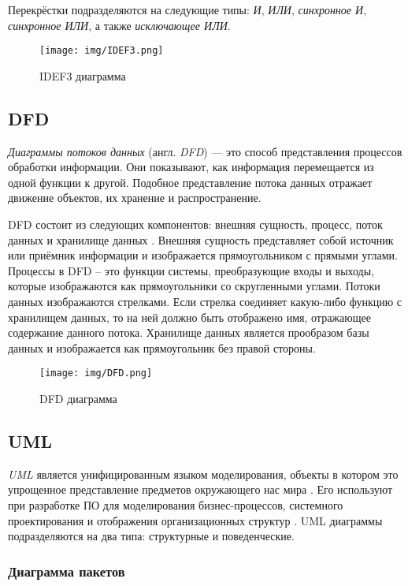 \documentclass[14pt,russian]{extarticle}
\newcommand*\obj[1]{\textit{#1}}
\newcommand*\term[1]{\textit{#1}}
\begin{document}
Перекрёстки подразделяются на следующие типы: \obj{И}, \obj{ИЛИ},
\obj{синхронное И}, \obj{синхронное ИЛИ}, а также \obj{исключающее ИЛИ}.

\begin{sidewaysfigure}
	\centering
	\texttt{[image: img/IDEF3.png]}
	\caption{IDEF3 диаграмма}
\end{sidewaysfigure}

\subsection{DFD}

\term{Диаграммы потоков данных} (англ. \term{DFD}) –-- это способ представления
процессов обработки информации. Они показывают, как информация перемещается из
одной функции к другой. Подобное представление потока данных отражает движение
объектов, их хранение и распространение.

DFD состоит из следующих компонентов: внешняя сущность, процесс, поток данных и
хранилище данных \cite{dfd}. Внешняя сущность представляет собой источник или приёмник
информации и изображается прямоугольником с прямыми углами. Процессы в DFD – это
функции системы, преобразующие входы и выходы, которые изображаются как
прямоугольники со скругленными углами. Потоки данных изображаются стрелками.
Если стрелка соединяет какую-либо функцию с хранилищем данных, то на ней должно
быть отображено имя, отражающее содержание данного потока. Хранилище данных
является прообразом базы данных и изображается как прямоугольник без правой
стороны.

\begin{figure}[H]
	\centering
	\texttt{[image: img/DFD.png]}
	\caption{DFD диаграмма}
\end{figure}

\subsection{UML}

\term{UML} является унифицированным языком моделирования, объекты в котором это
упрощенное представление предметов окружающего нас мира \cite{hunt}. Его используют при
разработке ПО для моделирования бизнес-процессов, системного проектирования и
отображения организационных структур \cite{fowler}. UML диаграммы подразделяются на два типа:
структурные и поведенческие.

\subsubsection{Диаграмма пакетов}
\end{document}
